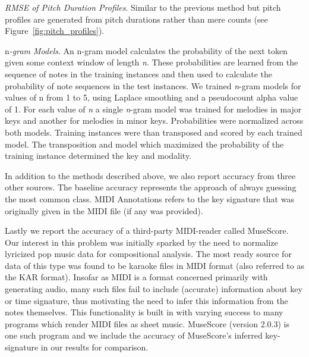 \documentclass[letterpaper]{article}
\begin{document}
\emph{RMSE of Pitch Duration Profiles}. Similar to the previous method but pitch profiles are generated from pitch durations rather than mere counts (see Figure~\ref{fig:pitch_profiles}). 

n\emph{-gram Models}. An n-gram model calculates the probability of the next token given some context window of length \emph{n}. These probabilities are learned from the sequence of notes in the training instances and then used to calculate the probability of note sequences in the test instances. We trained \emph{n}-gram models for values of n from 1 to 5, using Laplace smoothing and a pseudocount alpha value of 1. For each value of \emph{n} a single \emph{n}-gram model was trained for melodies in major keys and another for melodies in minor keys. Probabilities were normalized across both models. Training instances were than transposed and scored by each trained model. The transposition and model which maximized the probability of the training instance determined the key and modality.

In addition to the methods described above, we also report accuracy from three other sources. The baseline accuracy represents the approach of always guessing the most common class. MIDI Annotations refers to the key signature that was originally given in the MIDI file (if any was provided).

Lastly we report the accuracy of a third-party MIDI-reader called MuseScore. Our interest in this problem was initially sparked by the need to normalize lyricized pop music data for compositional analysis. The most ready source for data of this type was found to be karaoke files in MIDI format (also referred to as the KAR format). Insofar as MIDI is a format concerned primarily with generating audio, many such files fail to include (accurate) information about key or time signature, thus motivating the need to infer this information from the notes themselves. This functionality is built in with varying success to many programs which render MIDI files as sheet music. MuseScore (version 2.0.3) is one such program and we include the accuracy of MuseScore's inferred key-signature in our results for comparison. 
\end{document}
